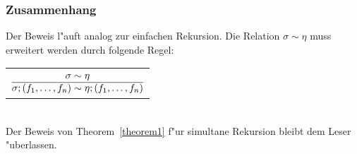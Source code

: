 \documentclass[12pt,a4paper,fleqn]{article}
\begin{document}
\subsubsection{Zusammenhang}

Der Beweis l"auft analog zur einfachen Rekursion. Die Relation $\sigma \sim \eta$ muss erweitert werden
durch folgende Regel: \\[5mm]
\begin{tabular}{c}
  $\RULE{\sigma \sim \eta}{\sigma;(f_1,\ldots,f_n) \sim \eta;(f_1,\ldots,f_n)}$ \\[3mm]
\end{tabular} \\[5mm]
Der Beweis von Theorem~\ref{theorem1} f"ur simultane Rekursion bleibt dem Leser "uberlassen.
\end{document}
